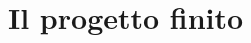\documentclass[../DocumentazioneProgetto.tex]{subfiles}
\begin{document}
	\section{Il progetto finito}
\end{document}
